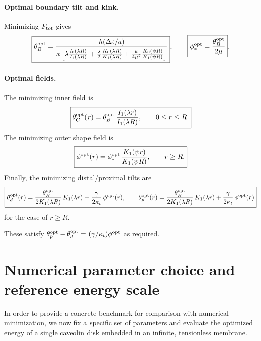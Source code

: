 \documentclass[11pt]{article}
\begin{document}
\paragraph{Optimal boundary tilt and kink.}
Minimizing $F_{\rm tot}$ gives
\begin{equation}
\boxed{
\theta_B^{\rm opt}
=
\frac{h(\Delta\varepsilon/a)}{
\kappa\left[
\lambda\frac{I_0(\lambda R)}{I_1(\lambda R)}
+\frac{\lambda}{2}\frac{K_0(\lambda R)}{K_1(\lambda R)}
+\frac{\psi}{4\mu^2}\frac{K_0(\psi R)}{K_1(\psi R)}
\right]
}
},
\qquad
\boxed{
\phi_*^{\rm opt}=\frac{\theta_B^{\rm opt}}{2\mu}
}.
\label{eq:thetaBopt_phiopt}
\end{equation}

\paragraph{Optimal fields.}
The minimizing inner field is
\begin{equation}
\boxed{
\theta_C^{\rm opt}(r)
=
\theta_B^{\rm opt}\,\frac{I_1(\lambda r)}{I_1(\lambda R)},
\qquad 0\le r\le R.
}
\end{equation}
The minimizing outer shape field is
\begin{equation}
\boxed{
\phi^{\rm opt}(r)=\phi_*^{\rm opt}\,\frac{K_1(\psi r)}{K_1(\psi R)},
\qquad r\ge R.
}
\end{equation}
Finally, the minimizing distal/proximal tilts are
\begin{equation}
\boxed{
\theta_d^{\rm opt}(r)
=
\frac{\theta_B^{\rm opt}}{2K_1(\lambda R)}\,K_1(\lambda r)
-\frac{\gamma}{2\kappa_t}\,\phi^{\rm opt}(r),
\qquad
\theta_p^{\rm opt}(r)
=
\frac{\theta_B^{\rm opt}}{2K_1(\lambda R)}\,K_1(\lambda r)
+\frac{\gamma}{2\kappa_t}\,\phi^{\rm opt}(r)
}
\end{equation}
for the case of $r\ge R$.


These satisfy $\theta_p^{\rm opt}-\theta_d^{\rm opt}=(\gamma/\kappa_t)\phi^{\rm opt}$ as required.

\section{Numerical parameter choice and reference energy scale}
\label{sec:one_disk_numbers}

In order to provide a concrete benchmark for comparison with numerical
minimization, we now fix a specific set of parameters and evaluate the
optimized energy of a single caveolin disk embedded in an infinite,
tensionless membrane.
\end{document}
